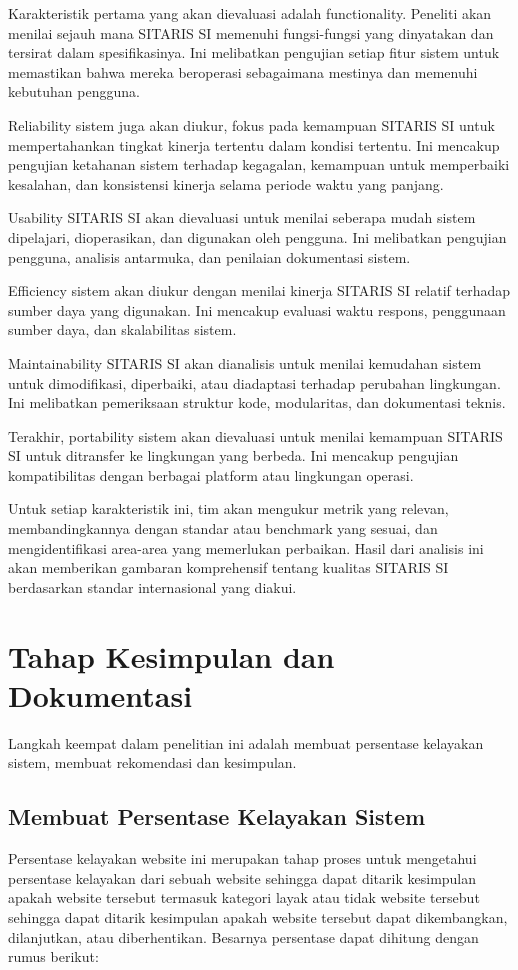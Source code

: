 Karakteristik pertama yang akan dievaluasi adalah functionality. Peneliti akan menilai sejauh mana SITARIS SI memenuhi fungsi-fungsi yang dinyatakan dan tersirat dalam spesifikasinya. Ini melibatkan pengujian setiap fitur sistem untuk memastikan bahwa mereka beroperasi sebagaimana mestinya dan memenuhi kebutuhan pengguna.

Reliability sistem juga akan diukur, fokus pada kemampuan SITARIS SI untuk mempertahankan tingkat kinerja tertentu dalam kondisi tertentu. Ini mencakup pengujian ketahanan sistem terhadap kegagalan, kemampuan untuk memperbaiki kesalahan, dan konsistensi kinerja selama periode waktu yang panjang.

Usability SITARIS SI akan dievaluasi untuk menilai seberapa mudah sistem dipelajari, dioperasikan, dan digunakan oleh pengguna. Ini melibatkan pengujian pengguna, analisis antarmuka, dan penilaian dokumentasi sistem.

Efficiency sistem akan diukur dengan menilai kinerja SITARIS SI relatif terhadap sumber daya yang digunakan. Ini mencakup evaluasi waktu respons, penggunaan sumber daya, dan skalabilitas sistem.

Maintainability SITARIS SI akan dianalisis untuk menilai kemudahan sistem untuk dimodifikasi, diperbaiki, atau diadaptasi terhadap perubahan lingkungan. Ini melibatkan pemeriksaan struktur kode, modularitas, dan dokumentasi teknis.

Terakhir, portability sistem akan dievaluasi untuk menilai kemampuan SITARIS SI untuk ditransfer ke lingkungan yang berbeda. Ini mencakup pengujian kompatibilitas dengan berbagai platform atau lingkungan operasi.

Untuk setiap karakteristik ini, tim akan mengukur metrik yang relevan, membandingkannya dengan standar atau benchmark yang sesuai, dan mengidentifikasi area-area yang memerlukan perbaikan. Hasil dari analisis ini akan memberikan gambaran komprehensif tentang kualitas SITARIS SI berdasarkan standar internasional yang diakui.

\section{Tahap Kesimpulan dan Dokumentasi}
Langkah keempat dalam penelitian ini adalah membuat persentase kelayakan sistem, membuat rekomendasi dan kesimpulan.

\subsection{Membuat Persentase Kelayakan Sistem}
Persentase kelayakan website ini merupakan tahap proses untuk mengetahui persentase kelayakan dari sebuah website sehingga dapat ditarik kesimpulan apakah website tersebut termasuk kategori layak atau tidak website tersebut sehingga dapat ditarik kesimpulan apakah website tersebut dapat dikembangkan, dilanjutkan, atau diberhentikan. Besarnya persentase dapat dihitung dengan rumus berikut:

